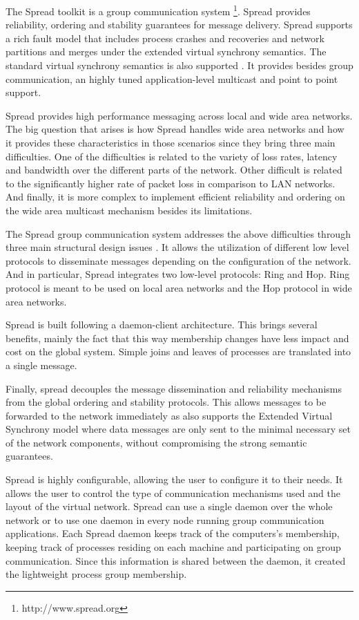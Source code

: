The Spread toolkit is a group communication system \footnote{http://www.spread.org}. Spread provides reliability, ordering and stability 
guarantees for message delivery. Spread supports a rich fault model that includes process crashes and recoveries and network partitions and merges under the extended virtual synchrony semantics. The standard virtual synchrony semantics is also supported \cite{Amir_thespreadtoolkit}. It provides besides group communication, an highly tuned application-level multicast and point to point support.

Spread provides high performance messaging across local and wide area networks. The big question that arises is how Spread handles wide area networks and how it provides these characteristics in those scenarios since they bring three main difficulties. One of the difficulties is related to the variety of loss rates, latency and bandwidth over the different parts of the network. Other difficult is related to the significantly higher rate of packet loss in comparison to LAN networks. And finally, it is more complex to implement efficient reliability and ordering on the wide area multicast mechanism besides its limitations.

The Spread group communication system addresses the above difficulties through three main structural design issues \cite{Amir_thespread}.
It allows the utilization of different low level protocols to disseminate messages depending on the configuration of the network. And in particular, Spread integrates two low-level protocols: Ring and Hop. Ring protocol is meant to be used on local area networks and the Hop protocol in wide area networks.

Spread is built following a daemon-client architecture. This brings several benefits, mainly the fact that this way membership changes have less impact and cost on the global system. Simple joins and leaves of processes are translated into a single message.

Finally, spread decouples the message dissemination and reliability mechanisms from the global ordering and stability protocols. This allows messages to be forwarded to the network immediately as also supports the Extended Virtual Synchrony model \cite{302392} where data messages are only sent to the minimal necessary set of the network components, without compromising the strong semantic guarantees.

Spread is highly configurable, allowing the user to configure it to their needs. It allows the user to control the type of communication mechanisms used and the layout of the virtual network. Spread can use a single daemon over the whole network or to use one daemon in every node running group communication applications. Each Spread daemon keeps track of the computers's membership, keeping track of processes residing on each machine and participating on group communication. Since this information is shared between the daemon, it created the lightweight process group membership.


